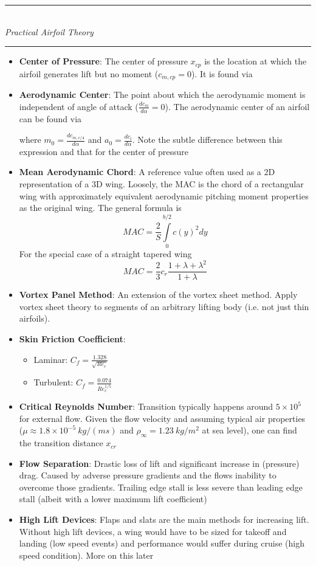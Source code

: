 \documentclass[11pt]{article}
\newcommand{\Item}[1]{\item \textbf{#1}:}
\newcommand{\Header}[1]{\noindent\rule{\textwidth}{0.4pt}\\[0.3cm]\indent \large{\textit{#1}}\normalsize{}\\[-0.1cm]\noindent\rule{\textwidth}{0.4pt}}
\newcommand{\CenteredBoxed}[1]{\begin{center}\boxed{#1}\end{center}}
\newcommand{\intlim}[2]{\int\limits_{#1}^{#2}}
\newcommand{\rhoinfty}{\rho_\infty}
\begin{document}
\Header{Practical Airfoil Theory}
\begin{itemize}
\Item{Center of Pressure} The center of pressure $x_{cp}$ is the location at which the airfoil generates lift but no moment ($c_{m,cp}=0$). It is found via
\CenteredBoxed{x_{cp}=\frac{c}{4}-\frac{M'_{c/4}}{L'}=c\left(\frac{1}{4}-\frac{c_{m,c/4}}{c_l}\right)}
\Item{Aerodynamic Center} The point about which the aerodynamic moment is independent of angle of attack ($\frac{dc_m}{d\alpha}=0$). The aerodynamic center of an airfoil can be found via
\CenteredBoxed{\bar{x}_{ac}=0.25-\frac{m_0}{a_0}}
where $m_0=\frac{dc_{m,c/4}}{d\alpha}$ and $a_0=\frac{dc_l}{d\alpha}$. Note the subtle difference between this expression and that for the center of pressure
\Item{Mean Aerodynamic Chord} A reference value often used as a 2D representation of a 3D wing. Loosely, the MAC is the chord of a rectangular wing with approximately equivalent aerodynamic pitching moment properties as the original wing. The general formula is
$$MAC =\frac{2}{S}\intlim{0}{b/2}c(y)^2dy$$
For the special case of a straight tapered wing
$$MAC = \frac{2}{3}c_r\frac{1+\lambda+\lambda^2}{1+\lambda}$$
\Item{Vortex Panel Method} An extension of the vortex sheet method. Apply vortex sheet theory to segments of an arbitrary lifting body (i.e. not just thin airfoils).
\Item{Skin Friction Coefficient} 
	\begin{itemize}
	\item Laminar: $C_f=\frac{1.328}{\sqrt{Re_c}}$
	\item Turbulent: $C_f=\frac{0.074}{Re_c^{1/5}}$
	\end{itemize}
\Item{Critical Reynolds Number} Transition typically happens around $5\times10^5$ for external flow. Given the flow velocity and assuming typical air properties ($\mu\approx1.8\times10^{-5}\ kg/(ms)$ and $\rhoinfty=1.23\ kg/m^2$ at sea level), one can find the transition distance $x_{cr}$
\Item{Flow Separation} Drastic loss of lift and significant increase in (pressure) drag. Caused by adverse pressure gradients and the flows inability to overcome those gradients. Trailing edge stall is less severe than leading edge stall (albeit with a lower maximum lift coefficient)
\Item{High Lift Devices} Flaps and slats are the main methods for increasing lift. Without high lift devices, a wing would have to be sized for takeoff and landing (low speed events) and performance would suffer during cruise (high speed condition). More on this later
\end{itemize}
\end{document}
